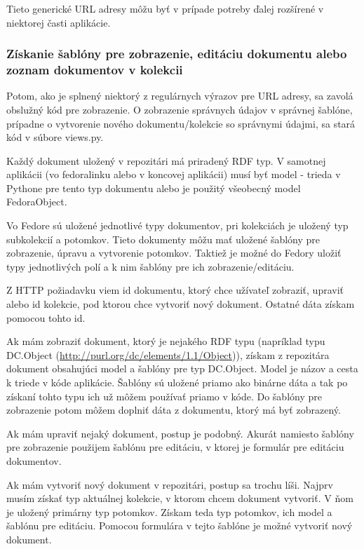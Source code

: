 \documentclass[thesis=M,slovak]{FITthesis}[2013/05/06]
\begin{document}
Tieto generické URL adresy môžu byť v prípade potreby ďalej rozšírené v niektorej časti aplikácie.

\subsubsection{Získanie šablóny pre zobrazenie, editáciu dokumentu alebo zoznam dokumentov v kolekcii}
Potom, ako je splnený niektorý z regulárnych výrazov pre URL adresy, sa zavolá obslužný kód pre zobrazenie. O zobrazenie správnych údajov v správnej šablóne, prípadne o vytvorenie nového dokumentu/kolekcie so správnymi údajmi, sa stará kód v súbore views.py.

Každý dokument uložený v repozitári má priradený RDF typ. V samotnej aplikácii (vo fedoralinku alebo v koncovej aplikácii) musí byť model - trieda v Pythone pre tento typ dokumentu alebo je použitý všeobecný model FedoraObject.

Vo Fedore sú uložené jednotlivé typy dokumentov, pri kolekciách je uložený typ subkolekcií a potomkov. Tieto dokumenty môžu mať uložené šablóny pre zobrazenie, úpravu a vytvorenie potomkov. Taktiež je možné do Fedory uložiť typy jednotlivých polí a k nim šablóny pre ich zobrazenie/editáciu.

Z HTTP požiadavku viem id dokumentu, ktorý chce užívateľ zobraziť, upraviť alebo id kolekcie, pod ktorou chce vytvoriť nový dokument. Ostatné dáta získam pomocou tohto id.

Ak mám zobraziť dokument, ktorý je nejakého RDF typu (napríklad typu DC.Object (\url{http://purl.org/dc/elements/1.1/Object})), získam z repozitára dokument obsahujúci model a šablóny pre typ DC.Object. Model je názov a cesta k triede v kóde aplikácie. Šablóny sú uložené priamo ako binárne dáta a tak po získaní tohto typu ich už môžem používať priamo v kóde. Do šablóny pre zobrazenie potom môžem doplniť dáta z dokumentu, ktorý má byť zobrazený.

Ak mám upraviť nejaký dokument, postup je podobný. Akurát namiesto šablóny pre zobrazenie použijem šablónu pre editáciu, v ktorej je formulár pre editáciu dokumentov.

Ak mám vytvoriť nový dokument v repozitári, postup sa trochu líši. Najprv musím získať typ aktuálnej kolekcie, v ktorom chcem dokument vytvoriť. V ňom je uložený primárny typ potomkov. Získam teda typ potomkov, ich model a šablónu pre editáciu. Pomocou formulára v tejto šablóne je možné vytvoriť nový dokument.
\end{document}
